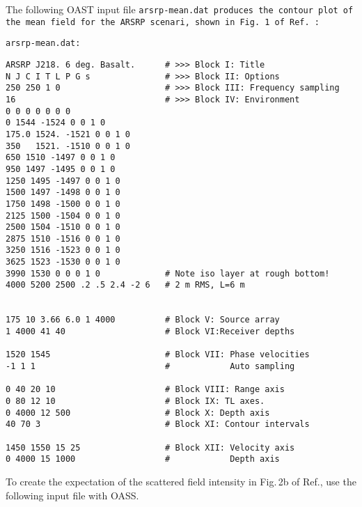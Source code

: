 The following OAST input file \tt arsrp-mean.dat \rm produces the
contour plot of the mean field for the ARSRP scenari, shown in Fig.\,1
of Ref.~\cite{sk:rvb94}:


\noindent \tt arsrp-mean.dat: \rm

\small
\begin{verbatim}
ARSRP J218. 6 deg. Basalt.      # >>> Block I: Title
N J C I T L P G s               # >>> Block II: Options
250 250 1 0                     # >>> Block III: Frequency sampling
16                              # >>> Block IV: Environment
0 0 0 0 0 0 0
0 1544 -1524 0 0 1 0
175.0 1524. -1521 0 0 1 0
350   1521. -1510 0 0 1 0
650 1510 -1497 0 0 1 0
950 1497 -1495 0 0 1 0
1250 1495 -1497 0 0 1 0
1500 1497 -1498 0 0 1 0
1750 1498 -1500 0 0 1 0
2125 1500 -1504 0 0 1 0
2500 1504 -1510 0 0 1 0
2875 1510 -1516 0 0 1 0
3250 1516 -1523 0 0 1 0
3625 1523 -1530 0 0 1 0
3990 1530 0 0 0 1 0             # Note iso layer at rough bottom!
4000 5200 2500 .2 .5 2.4 -2 6   # 2 m RMS, L=6 m


175 10 3.66 6.0 1 4000          # Block V: Source array
1 4000 41 40                    # Block VI:Receiver depths

1520 1545                       # Block VII: Phase velocities
-1 1 1                          #            Auto sampling

0 40 20 10                      # Block VIII: Range axis
0 80 12 10                      # Block IX: TL axes.
0 4000 12 500                   # Block X: Depth axis
40 70 3                         # Block XI: Contour intervals

1450 1550 15 25                 # Block XII: Velocity axis
0 4000 15 1000                  #            Depth axis
\end{verbatim}

To create the expectation of the scattered field intensity in Fig.\,2b
of Ref.\cite{sk:rvb94}, use the following input file with OASS.

